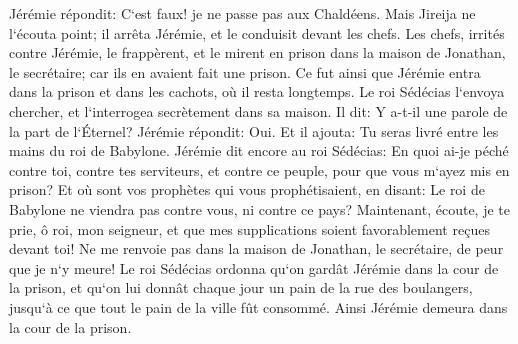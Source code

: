 \verse Jérémie répondit: C`est faux! je ne passe pas aux Chaldéens. Mais Jireija ne l`écouta point; il arrêta Jérémie, et le conduisit devant les chefs. 
\verse Les chefs, irrités contre Jérémie, le frappèrent, et le mirent en prison dans la maison de Jonathan, le secrétaire; car ils en avaient fait une prison. 
\verse Ce fut ainsi que Jérémie entra dans la prison et dans les cachots, où il resta longtemps. 
\verse Le roi Sédécias l`envoya chercher, et l`interrogea secrètement dans sa maison. Il dit: Y a-t-il une parole de la part de l`Éternel? Jérémie répondit: Oui. Et il ajouta: Tu seras livré entre les mains du roi de Babylone. 
\verse Jérémie dit encore au roi Sédécias: En quoi ai-je péché contre toi, contre tes serviteurs, et contre ce peuple, pour que vous m`ayez mis en prison? 
\verse Et où sont vos prophètes qui vous prophétisaient, en disant: Le roi de Babylone ne viendra pas contre vous, ni contre ce pays? 
\verse Maintenant, écoute, je te prie, ô roi, mon seigneur, et que mes supplications soient favorablement reçues devant toi! Ne me renvoie pas dans la maison de Jonathan, le secrétaire, de peur que je n`y meure! 
\verse Le roi Sédécias ordonna qu`on gardât Jérémie dans la cour de la prison, et qu`on lui donnât chaque jour un pain de la rue des boulangers, jusqu`à ce que tout le pain de la ville fût consommé. Ainsi Jérémie demeura dans la cour de la prison. 

